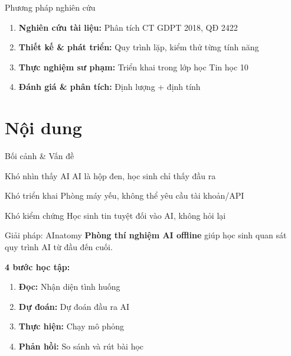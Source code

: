 \documentclass[10pt,xcolor=dvipsnames]{beamer}
\begin{document}
\begin{frame}{Phương pháp nghiên cứu}
  \begin{enumerate}
    \item \textbf{Nghiên cứu tài liệu:} Phân tích CT GDPT 2018, QĐ 2422
    \item \textbf{Thiết kế \& phát triển:} Quy trình lặp, kiểm thử từng tính năng
    \item \textbf{Thực nghiệm sư phạm:} Triển khai trong lớp học Tin học 10
    \item \textbf{Đánh giá \& phân tích:} Định lượng + định tính
  \end{enumerate}
\end{frame}

\section{Nội dung}

\begin{frame}{Bối cảnh \& Vấn đề}
  \begin{alertblock}{Khó nhìn thấy AI}
    AI là hộp đen, học sinh chỉ thấy đầu ra
  \end{alertblock}
  
  \begin{alertblock}{Khó triển khai}
    Phòng máy yếu, không thể yêu cầu tài khoản/API
  \end{alertblock}
  
  \begin{alertblock}{Khó kiểm chứng}
    Học sinh tin tuyệt đối vào AI, không hỏi lại
  \end{alertblock}
\end{frame}

\begin{frame}{Giải pháp: AInatomy}
  \textbf{Phòng thí nghiệm AI offline} giúp học sinh quan sát quy trình AI từ đầu đến cuối.
  
  \vspace{1em}
  \textbf{4 bước học tập:}
  \begin{enumerate}
    \item \textbf{Đọc:} Nhận diện tình huống
    \item \textbf{Dự đoán:} Dự đoán đầu ra AI
    \item \textbf{Thực hiện:} Chạy mô phỏng
    \item \textbf{Phản hồi:} So sánh và rút bài học
  \end{enumerate}
\end{frame}
\end{document}
